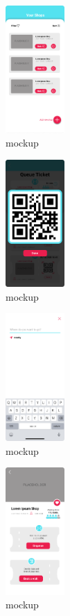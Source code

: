 \begin{figure}[h!]
    \centering
    \includegraphics[width=0.2\textwidth]{mockups/ManagerHomePage.png}
    \caption{\label{fig:mockup}mockup}
\end{figure}

\begin{figure}[h!]
    \centering
    \includegraphics[width=0.2\textwidth]{mockups/QRcodePage.png}
    \caption{\label{fig:mockup}mockup}
\end{figure}

\begin{figure}[h!]
    \centering
    \includegraphics[width=0.2\textwidth]{mockups/SearchPage.png}
    \caption{\label{fig:mockup}mockup}
\end{figure}

\begin{figure}[h!]
    \centering
    \includegraphics[width=0.2\textwidth]{mockups/ShopPage.png}
    \caption{\label{fig:mockup}mockup}
\end{figure}

